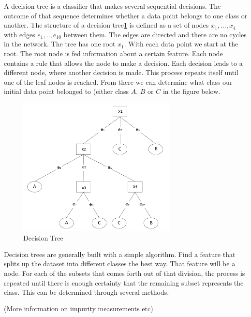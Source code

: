 \hspace{0.5cm} A decision tree is a classifier that makes several sequential decisions. The outcome of that sequence determines whether a data point belongs to one class or another. The structure of a decision tree\ref{fig:DT} is defined as a set of nodes ${x_1, ... , x_4}$ with edges ${e_1, .., e_{10}}$ between them. The edges are directed and there are no cycles in the network. The tree has one root $x_1$. With each data point we start at the root. The root node is fed information about a certain feature. Each node contains a rule that allows the node to make a decision. Each decision leads to a different node, where another decision is made. This process repeats itself until one of the leaf nodes is reached\cite{safavian1991survey}. From there we can determine what class our initial data point belonged to (either class $A$, $B$ or $C$ in the figure below. 
\begin{figure}[H]
    \includegraphics[width=80mm]{./img/decisiontree.png}
    \caption{Decision Tree}
    \label{fig:DT}
\end{figure}
Decision trees are generally built with a simple algorithm. Find a feature that splits up the dataset into different classes the best way. That feature will be a node. For each of the subsets that comes forth out of that division, the process is repeated until there is enough certainty that the remaining subset represents the class. This can be determined through several methods. 

(More information on impurity measurements etc)

